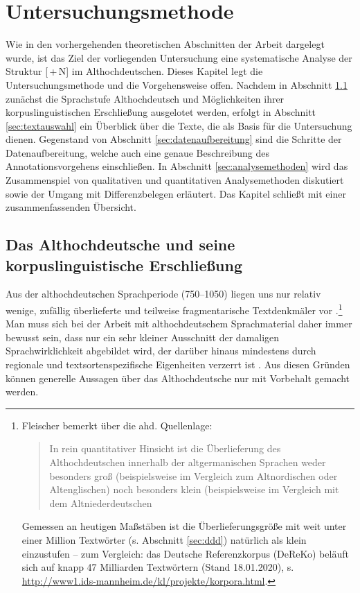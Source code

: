 \chapter{Untersuchungsmethode}\label{methode}

Wie in den vorhergehenden theoretischen Abschnitten der Arbeit dargelegt wurde, ist das Ziel der vorliegenden Untersuchung eine systematische Analyse der Struktur [\,+\,N] im Althochdeutschen. Dieses Kapitel legt die Untersuchungsmethode und die Vorgehensweise offen. Nachdem in Abschnitt \ref{sec:ahd} zunächst die Sprachstufe Althochdeutsch und Möglichkeiten ihrer korpuslinguistischen Erschließung ausgelotet werden, erfolgt in Abschnitt \ref{sec:textauswahl} ein Überblick über die Texte, die als Basis für die Untersuchung dienen. Gegenstand von Abschnitt \ref{sec:datenaufbereitung} sind die Schritte der Datenaufbereitung, welche auch eine genaue Beschreibung des Annotationsvorgehens einschließen. In Abschnitt \ref{sec:analysemethoden} wird das Zusammenspiel von qualitativen und quantitativen Analysemethoden diskutiert sowie der Umgang mit Differenzbelegen erläutert. Das Kapitel schließt mit einer zusammenfassenden Übersicht. 

\section{Das Althochdeutsche und seine korpuslinguistische Erschließung}\label{sec:ahd}

Aus der althochdeutschen Sprachperiode (750--1050) liegen uns nur relativ wenige, zufällig überlieferte und teilweise fragmentarische Textdenkmäler vor \parencite[zur Überlieferungsproblematik s. ausführlich][49--105]{Sonderegger2003}.\footnote{Fleischer bemerkt über die ahd. Quellenlage: \blockcquote[27]{Fleischer2006}{In rein quantitativer Hinsicht ist die Überlieferung des Althochdeutschen innerhalb der altgermanischen Sprachen weder besonders groß (beispielsweise im Vergleich zum Altnordischen oder Altenglischen) noch besonders  klein (beispielsweise im Vergleich mit dem Altniederdeutschen}. Gemessen an heutigen Maßstäben ist die Überlieferungsgröße mit weit unter einer Million Textwörter (s. Abschnitt \ref{sec:ddd}) natürlich als klein einzustufen -- zum Vergleich: das Deutsche Referenzkorpus (DeReKo) beläuft sich auf knapp 47 Milliarden Textwörtern (Stand 18.01.2020), s. \url{http://www1.ids-mannheim.de/kl/projekte/korpora.html}.} Man muss sich bei der Arbeit mit althochdeutschem Sprachmaterial daher immer bewusst sein, dass  nur ein sehr kleiner Ausschnitt der damaligen Sprachwirklichkeit abgebildet wird, der darüber hinaus mindestens durch regionale und textsortenspezifische Eigenheiten verzerrt ist  \parencite[27ff.]{Fleischer2006}. Aus diesen Gründen können generelle Aussagen über das Althochdeutsche nur mit Vorbehalt gemacht werden. 

